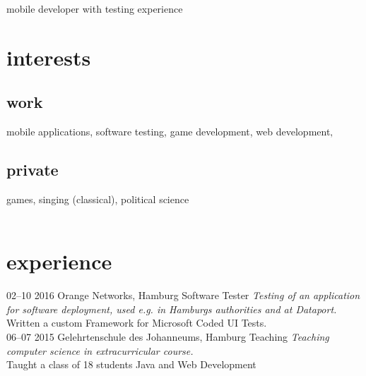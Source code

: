 \documentclass[]{friggeri-cv}
\begin{document}
       {mobile developer with testing experience}



\section{interests}
  \subsection{work}
    mobile applications, software testing, game development, web development‚ \\
  \subsection{private}
    games, singing (classical), political science \\ \\


\section{experience}

\begin{entrylist}
  \entry
    {02–10 2016}
    {Orange Networks, Hamburg}
    {Software Tester}
    {\emph{Testing of an application for software deployment, used e.g. in Hamburgs authorities and at Dataport.}\\
    Written a custom Framework for Microsoft Coded UI Tests.} \\
  \entry
    {06–07 2015}
    {Gelehrtenschule des Johanneums, Hamburg}
    {Teaching}
    {\emph{Teaching computer science in extracurricular course.}\\
    Taught a class of 18 students Java and Web Development}
\end{entrylist} \\ \\
\end{document}
